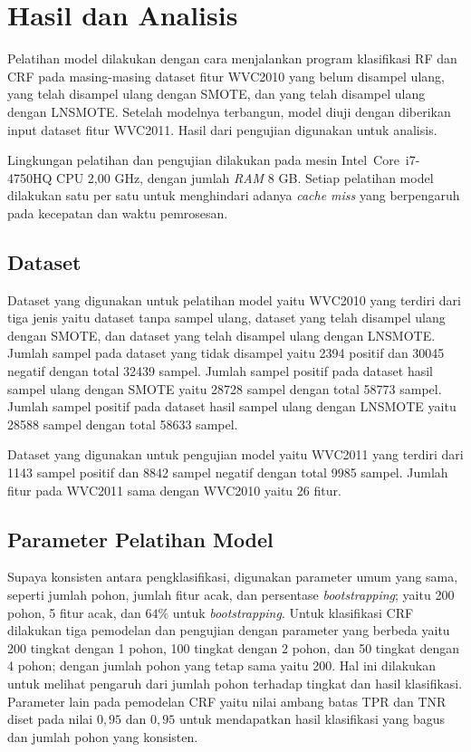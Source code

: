 \chapter{Hasil dan Analisis}

Pelatihan model dilakukan dengan cara menjalankan program klasifikasi RF dan
CRF pada masing-masing dataset fitur WVC2010 yang belum disampel ulang, yang
telah disampel ulang dengan SMOTE, dan yang telah disampel ulang dengan
LNSMOTE.
Setelah modelnya terbangun, model diuji dengan diberikan input dataset fitur
WVC2011. Hasil dari pengujian digunakan untuk analisis.

Lingkungan pelatihan dan pengujian dilakukan pada mesin Intel\textregistered\
 Core\texttrademark \ i7-4750HQ CPU 2,00 GHz, dengan jumlah \textit{RAM} 8
GB. Setiap pelatihan model dilakukan satu per satu untuk menghindari adanya
\textit{cache miss} yang berpengaruh pada kecepatan dan waktu pemrosesan.

\section{Dataset}

Dataset yang digunakan untuk pelatihan model yaitu WVC2010 yang terdiri dari
tiga jenis yaitu dataset tanpa sampel ulang, dataset yang telah disampel ulang
dengan SMOTE, dan dataset yang telah disampel ulang dengan LNSMOTE.
Jumlah sampel pada dataset yang tidak disampel yaitu 2394 positif dan 30045
negatif dengan total 32439 sampel.
Jumlah sampel positif pada dataset hasil sampel ulang dengan SMOTE yaitu 28728
sampel dengan total 58773 sampel.
Jumlah sampel positif pada dataset hasil sampel ulang dengan LNSMOTE yaitu
28588 sampel dengan total 58633 sampel.

Dataset yang digunakan untuk pengujian model yaitu WVC2011 yang terdiri dari
1143 sampel positif dan 8842 sampel negatif dengan total 9985 sampel.
Jumlah fitur pada WVC2011 sama dengan WVC2010 yaitu 26 fitur.

\section{Parameter Pelatihan Model}

Supaya konsisten antara pengklasifikasi, digunakan parameter umum yang sama,
seperti jumlah pohon, jumlah fitur acak, dan persentase \textit{bootstrapping};
yaitu 200 pohon, 5 fitur acak, dan $ 64\% $ untuk \textit{bootstrapping}.
Untuk klasifikasi CRF dilakukan tiga pemodelan dan pengujian dengan parameter
yang berbeda yaitu 200 tingkat dengan 1 pohon, 100 tingkat dengan 2 pohon, dan
50 tingkat dengan 4 pohon; dengan jumlah pohon yang tetap sama yaitu 200.
Hal ini dilakukan untuk melihat pengaruh dari jumlah pohon terhadap tingkat dan
hasil klasifikasi.
Parameter lain pada pemodelan CRF yaitu nilai ambang batas TPR dan TNR diset
pada nilai $0,95$ dan $0,95$ untuk mendapatkan hasil klasifikasi yang bagus dan
jumlah pohon yang konsisten.

